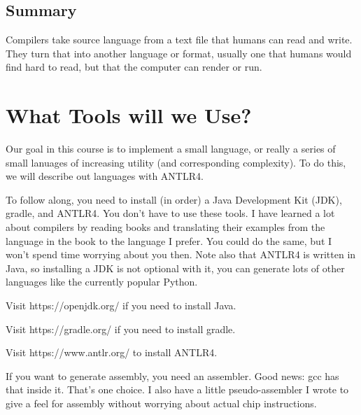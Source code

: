\subsection{Summary}

Compilers take source language from a text file that humans can read
and write. They turn that into another language or format, usually
one that humans would find hard to read, but that the computer can
render or run.

\section{What Tools will we Use?}

Our goal in this course is to implement a small language, or really
a series of small lanuages of increasing utility (and corresponding
complexity). To do this, we will describe out languages with ANTLR4.

To follow along, you need to install (in order) a Java Development
Kit (JDK), gradle, and ANTLR4. You don't have to use these tools.
I have learned a lot about compilers by reading books and translating
their examples from the language in the book to the language I prefer.
You could do the same, but I won't spend time worrying about you then.
Note also that ANTLR4 is written in Java, so installing a JDK is not
optional with it, you can generate lots of other languages like
the currently popular Python.

Visit https://openjdk.org/ if you need to install Java.

Visit https://gradle.org/ if you need to install gradle.

Visit https://www.antlr.org/ to install ANTLR4.

If you want to generate assembly, you need an assembler. Good news:
gcc has that inside it. That's one choice. I also have a little
pseudo-assembler I wrote to give a feel for assembly without worrying
about actual chip instructions.
